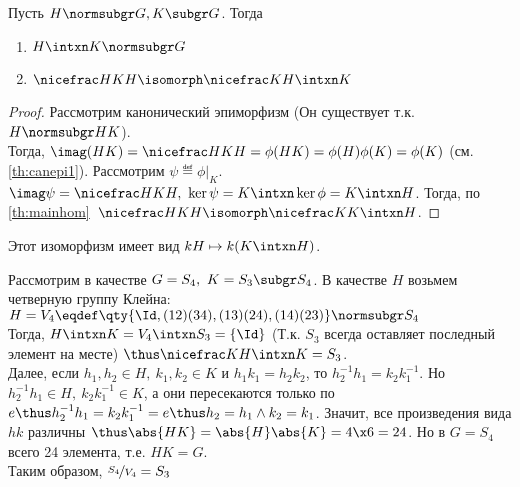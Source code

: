 \begin{theorem}
  Пусть $H\normsubgr G, K\subgr G$. Тогда
  \begin{enumerate}
    \item $H\intxn K\normsubgr G$
    \item $\factorgr{HK}{H}\isomorph \factorgr{K}{H\intxn K}$
  \end{enumerate}
\end{theorem}
\begin{proof}
  Рассмотрим канонический эпиморфизм  (Он существует т.\:к. $H\normsubgr HK$).\\
  Тогда, $\imag(HK)=\factorgr{HK}{H}=\phi(HK)=\phi(H)\phi(K)=\phi(K)$ (см. \ref{th:canepi1}). Рассмотрим $\psi\eqdef \phi|_K$. $\imag\psi=\factorgr{HK}{H},\ \ker\psi=K\intxn\ker\phi=K\intxn H$. Тогда, по \ref{th:mainhom}\ $\factorgr{HK}{H}\isomorph \factorgr{K}{K\intxn H}$.
\end{proof}
\begin{remark}
  Этот изоморфизм имеет вид $kH\mapsto k(K\intxn H)$.
\end{remark}

\begin{example}
  Рассмотрим в качестве $G=S_4,\ K=S_3\subgr S_4$. В качестве $H$ возьмем четверную группу Клейна: $H=V_4\eqdef\qty{\Id, (1 2)(3 4), (1 3)(2 4), (1 4)(2 3)}\normsubgr S_4$\\
  Тогда, $H\intxn K= V_4\intxn S_3=\{\Id\}$ (Т.\:к. $S_3$ всегда оставляет последный элемент на месте) $\thus\factorgr{K}{H\intxn K}=S_3$.\\
  Далее, если $h_1,h_2\in H,\ k_1,k_2\in K$ и $h_1k_1=h_2k_2$, то $h_2^{-1} h_1=k_2k_1^{-1}$. Но $h_2^{-1} h_1\in H,\ k_2k_1^{-1}\in K$, а они пересекаются только по $e\thus h_2^{-1} h_1=k_2k_1^{-1}=e\thus h_2=h_1 \land k_2=k_1$. Значит, все произведения вида $hk$ различны $\thus \abs{HK}=\abs{H}\abs{K}=4\x6=24$. Но в $G=S_4$ всего 24 элемента, т.\:е. $HK=G$.\\
  Таким образом, $\factorgr{S_4}{V_4}=S_3$
\end{example}

